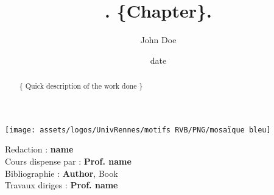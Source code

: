 \documentclass{config/ISTIC-UR}
\title{\fontfamily{phv}\selectfont . \{Chapter\}.}
\date{date}
\author{John Doe}
\begin{document}
    \begin{titlepage}

        \maketitle

        \center\texttt{[image: assets/logos/UnivRennes/motifs RVB/PNG/mosaïque bleu]}

        \begin{abstract}
            \{
            Quick description of the work done
            \}
        \end{abstract}
        \vspace{5em}

        \newpage

        \tableofcontents

        \vspace{5em}

        \begin{contributors}
            \vspace{.25em}
            Redaction : \textbf{name} \\
            Cours dispense par : \textbf{Prof. name} \\
            Bibliographie : \textbf{Author}, Book\\
            Travaux diriges : \textbf{Prof. name} \\
            \vspace{.25em}
        \end{contributors}

    \end{titlepage}
\end{document}

